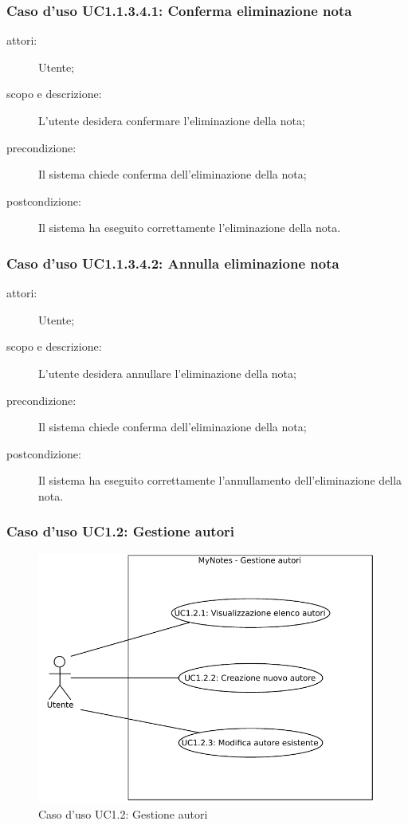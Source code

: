 \subsubsection{Caso d'uso UC1.1.3.4.1: Conferma eliminazione nota}
\begin{description}
\item[attori:] Utente;
\item[scopo e descrizione:] L'utente desidera confermare l'eliminazione della nota;
\item[precondizione:] Il sistema chiede conferma dell'eliminazione della nota;
\item[postcondizione:] Il sistema ha eseguito correttamente l'eliminazione della nota.
\end{description}

\subsubsection{Caso d'uso UC1.1.3.4.2: Annulla eliminazione nota}
\begin{description}
\item[attori:] Utente;
\item[scopo e descrizione:] L'utente desidera annullare l'eliminazione della nota;
\item[precondizione:] Il sistema chiede conferma dell'eliminazione della nota;
\item[postcondizione:] Il sistema ha eseguito correttamente l'annullamento dell'eliminazione della nota.
\end{description}

\subsubsection{Caso d'uso UC1.2: Gestione autori}
\begin{figure}[htb]
\centering
\includegraphics[scale=0.6]{gfx/useCase/MN_UC1-2_Gestione_autori.pdf}
\caption{Caso d'uso UC1.2: Gestione autori}
\label{fig:My notes UC1.2}
\end{figure}

